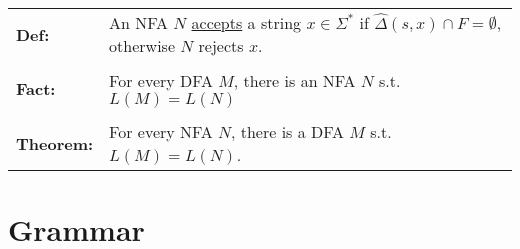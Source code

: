 \documentclass[11pt]{article}
\begin{document}
\begin{tabular}{ll}
{\bf Def:} & An NFA $N$ \underline{accepts} a string $x\in\Sigma^*$ if $\hat{\Delta}(s,x)\cap F=\emptyset$, otherwise $N$ rejects $x$. \\
\\
{\bf Fact:} & For every DFA $M$, there is an NFA $N$ s.t. $L(M)=L(N)$ \\
\\
{\bf Theorem:} & For every NFA $N$, there is a DFA $M$ s.t. $L(M)=L(N)$. \\
\end{tabular}

\section{Grammar}
\end{document}
